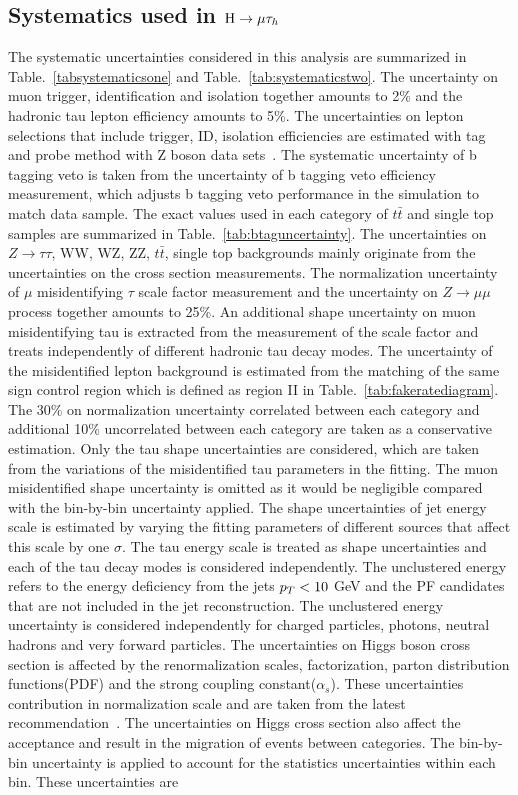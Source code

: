 \subsection{Systematics used in $\mathrm{H}\to \mu\tau_{h}$}
The systematic uncertainties considered in this analysis are summarized in Table.~\ref{tabsystematicsone} and Table.~\ref{tab:systematicstwo}. The uncertainty on muon trigger, identification and isolation together amounts  to 2\% and the hadronic tau lepton efficiency amounts to 5\%. The uncertainties on lepton selections that include trigger, ID, isolation efficiencies are estimated with tag and probe method with Z boson data sets~\cite{Khachatryan2011,Chatrchyan:2012xi,Khachatryan:2015hwa,Khachatryan:2015dfa,CMS:2016gvn}. The systematic uncertainty of b tagging veto is taken from the uncertainty of b tagging veto efficiency measurement, which adjusts b tagging veto performance in the simulation to match data sample. The exact values used in each category of $t\bar{t}$ and single top samples are summarized in Table.~\ref{tab:btaguncertainty}. The uncertainties on $Z\to\tau\tau$, WW, WZ, ZZ, $t\bar{t}$, single top backgrounds mainly originate from the uncertainties on the cross section measurements. The normalization uncertainty of $\mu$ misidentifying $\tau$ scale factor measurement and the uncertainty on $Z\to \mu\mu$ process together amounts to 25\%. An additional shape uncertainty on muon misidentifying tau is extracted from the measurement of the scale factor and treats independently of different hadronic tau decay modes. The uncertainty of the misidentified lepton background is estimated from the matching of the same sign control region which is defined as region II in Table.~\ref{tab:fakeratediagram}. The 30\% on normalization uncertainty correlated between each category and additional 10\% uncorrelated between each category are taken as a conservative estimation. Only the tau shape uncertainties are considered, which are taken from the variations of the misidentified tau parameters in the fitting. The muon misidentified shape uncertainty is omitted as it would be negligible compared with the bin-by-bin uncertainty applied.  The shape uncertainties of jet energy scale is estimated by varying the fitting parameters of different sources that affect this scale by one $\sigma$. The tau energy scale is treated as shape uncertainties and each of the tau decay modes is considered independently. The unclustered energy refers to the energy deficiency from the jets $p_{T}<10$ GeV and the PF candidates that are not included in the jet reconstruction. The unclustered energy uncertainty is considered independently for charged particles, photons, neutral hadrons and very forward particles.  The uncertainties on Higgs boson cross section is affected by the renormalization scales, factorization, parton distribution functions(PDF) and the strong coupling constant($\alpha_{s}$). These uncertainties contribution in normalization scale and are taken from the latest recommendation~\cite{YR4}. The uncertainties on Higgs cross section also affect the acceptance and result in the migration of events between categories.  The bin-by-bin uncertainty is applied to account for the statistics uncertainties within each bin. These uncertainties are 